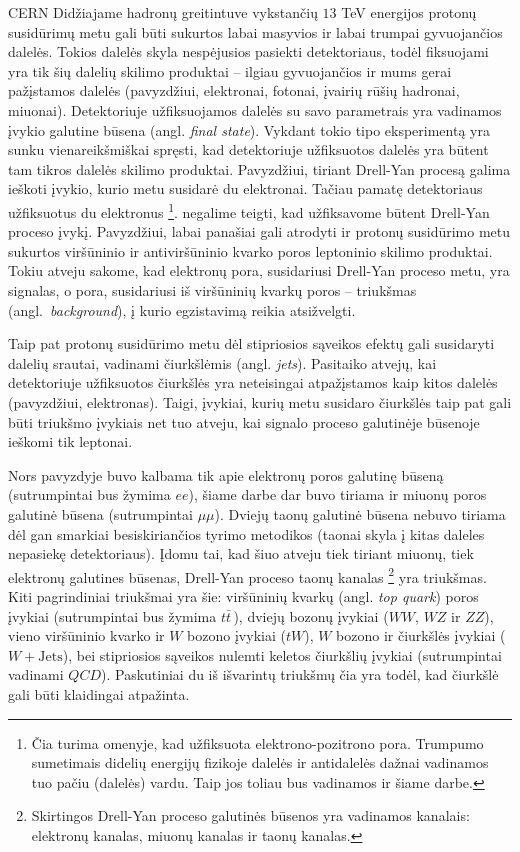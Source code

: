 \documentclass[a4paper, 12pt]{article}
\newcommand{\mumu}{\mu\mu}
\newcommand{\WJets}{W\! +\!\mathrm{Jets}}
\newcommand{\QCD}{QC\! D}
\newlength\q
\begin{document}
CERN Didžiajame hadronų greitintuve vykstančių $13$ TeV energijos protonų susidūrimų metu gali
būti sukurtos labai masyvios ir labai trumpai gyvuojančios dalelės.
Tokios dalelės skyla nespėjusios pasiekti detektoriaus, todėl fiksuojami yra tik šių dalelių
skilimo produktai -- ilgiau gyvuojančios ir mums gerai pažįstamos dalelės (pavyzdžiui,
elektronai, fotonai, įvairių rūšių hadronai, miuonai).
Detektoriuje užfiksuojamos dalelės su savo parametrais yra vadinamos įvykio galutine būsena
(angl. \textit{final state}).
Vykdant tokio tipo eksperimentą yra sunku vienareikšmiškai spręsti, kad detektoriuje užfiksuotos
dalelės yra būtent tam tikros dalelės skilimo produktai.
Pavyzdžiui, tiriant Drell-Yan procesą galima ieškoti įvykio, kurio metu susidarė du elektronai.
Tačiau pamatę detektoriaus užfiksuotus du elektronus
\footnote{Čia turima omenyje, kad užfiksuota elektrono-pozitrono pora.
	Trumpumo sumetimais didelių energijų fizikoje dalelės ir antidalelės dažnai vadinamos tuo
	pačiu (dalelės) vardu.
	Taip jos toliau bus vadinamos ir šiame darbe.}.
negalime teigti, kad užfiksavome būtent Drell-Yan proceso įvykį.
Pavyzdžiui, labai panašiai gali atrodyti ir protonų susidūrimo metu sukurtos viršūninio ir
antiviršūninio kvarko poros leptoninio skilimo produktai.
Tokiu atveju sakome, kad elektronų pora, susidariusi Drell-Yan proceso metu, yra signalas, o
pora, susidariusi iš viršūninių kvarkų poros -- triukšmas (angl.\ \textit{background}), į
kurio egzistavimą reikia atsižvelgti.

Taip pat protonų susidūrimo metu dėl stipriosios sąveikos efektų gali susidaryti dalelių
srautai, vadinami čiurkšlėmis (angl. \textit{jets}).
Pasitaiko atvejų, kai detektoriuje užfiksuotos čiurkšlės yra neteisingai atpažįstamos kaip
kitos dalelės (pavyzdžiui, elektronas).
Taigi, įvykiai, kurių metu susidaro čiurkšlės taip pat gali būti triukšmo įvykiais net tuo
atveju, kai signalo proceso galutinėje būsenoje ieškomi tik leptonai.

Nors pavyzdyje buvo kalbama tik apie elektronų poros galutinę būseną (sutrumpintai bus
žymima $ee$), šiame darbe dar buvo tiriama ir miuonų poros galutinė būsena (sutrumpintai $\mumu$).	 
Dviejų taonų galutinė būsena nebuvo tiriama dėl gan smarkiai besiskiriančios tyrimo metodikos
(taonai skyla į kitas daleles nepasiekę detektoriaus). Įdomu tai, kad šiuo atveju tiek tiriant
miuonų, tiek elektronų galutines būsenas, Drell-Yan proceso taonų kanalas
	\footnote{Skirtingos Drell-Yan proceso galutinės būsenos yra vadinamos kanalais:
	elektronų kanalas, miuonų kanalas ir taonų kanalas.}
yra triukšmas. Kiti pagrindiniai triukšmai yra šie: viršūninių kvarkų (angl. \textit{top quark})
poros įvykiai (sutrumpintai bus žymima $t\bar{t}\,$), dviejų bozonų įvykiai ($WW$, $WZ$ ir $ZZ$),
vieno viršūninio kvarko ir $W$ bozono įvykiai ($tW$), $W$ bozono ir čiurkšlės įvykiai ($\WJets$),
bei stipriosios sąveikos nulemti keletos čiurkšlių įvykiai (sutrumpintai vadinami $\QCD$).
Paskutiniai du iš išvarintų triukšmų čia yra todėl, kad čiurkšlė gali būti klaidingai atpažinta.
\end{document}
